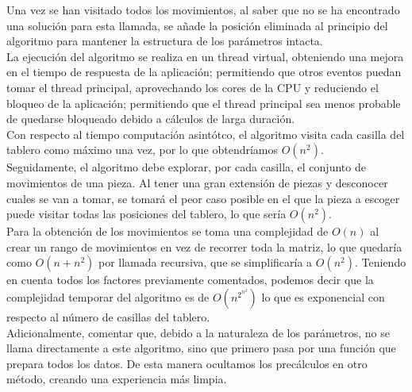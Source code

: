 Una vez se han visitado todos los movimientos, al saber que no se ha encontrado una solución para esta llamada, se añade la posición eliminada al principio del algoritmo para mantener la estructura de los parámetros intacta.\\

La ejecución del algoritmo se realiza en un thread virtual, obteniendo una mejora en el tiempo de respuesta de la aplicación; permitiendo que otros eventos puedan tomar el thread principal, aprovechando los cores de la CPU y reduciendo el bloqueo de la aplicación; permitiendo que el thread principal sea menos probable de quedarse bloqueado debido a cálculos de larga duración.\\

Con respecto al tiempo computación asintótco, el algoritmo visita cada casilla del tablero como máximo una vez, por lo que obtendríamos $O(n^2)$. \\

Seguidamente, el algoritmo debe explorar, por cada casilla, el conjunto de movimientos de una pieza. Al tener una gran extensión de piezas y desconocer cuales se van a tomar, se tomará el peor caso posible en el que la pieza a escoger puede visitar todas las posiciones del tablero, lo que sería $O(n^2)$. \\

Para la obtención de los movimientos se toma una complejidad de $O(n)$ al crear un rango de movimientos en vez de recorrer toda la matriz, lo que quedaría como $O(n + n^2)$ por llamada recursiva, que se simplificaría a $O(n^2)$. Teniendo en cuenta todos los factores previamente comentados, podemos decir que la complejidad temporar del algoritmo es de $O\left( n^{2^{n^2}}\right)$ lo que es exponencial con respecto al número de casillas del tablero. \\

Adicionalmente, comentar que, debido a la naturaleza de los parámetros, no se llama directamente a este algoritmo, sino que primero pasa por una función que prepara todos los datos. De esta manera ocultamos los precálculos en otro método, creando una experiencia más limpia.\\